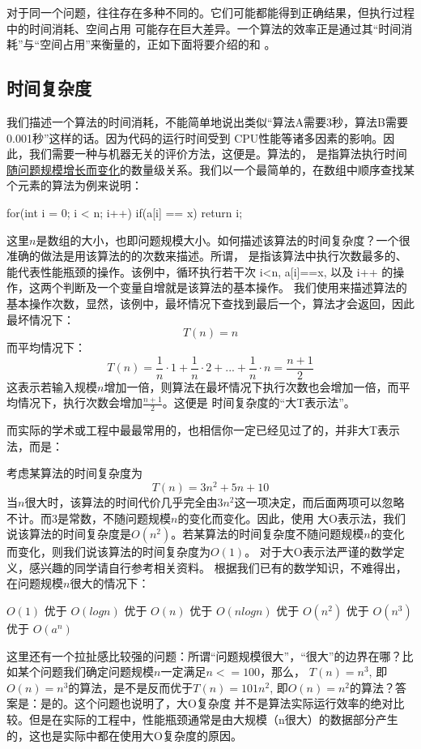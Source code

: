 对于同一个问题，往往存在多种不同的。它们可能都能得到正确结果，但执行过程中的时间消耗、空间占用
可能存在巨大差异。一个算法的效率正是通过其“时间消耗”与“空间占用”来衡量的，正如下面将要介绍的和
。

\subsection{时间复杂度}
我们描述一个算法的时间消耗，不能简单地说出类似“算法A需要3秒，算法B需要0.001秒”这样的话。因为代码的运行时间受到
CPU性能等诸多因素的影响。因此，我们需要一种与机器无关的评价方法，这便是。算法的，
是指算法执行时间\uline{随问题规模增长而变化}的数量级关系。我们以一个最简单的，在数组中顺序查找某个元素的算法为例来说明：
\begin{cppcode}
for(int i = 0; i < n; i++)
{
    if(a[i] == x)
        return i;
}
\end{cppcode}
这里\(n\)是数组的大小，也即问题规模大小。如何描述该算法的时间复杂度？一个很准确的做法是用该算法的的次数来描述。所谓，
是指该算法中执行次数最多的、能代表性能瓶颈的操作。该例中，循环执行若干次 i<n, a[i]==x, 以及 i++ 的操作，这两个判断及一个变量自增就是该算法的基本操作。
我们使用来描述算法的基本操作次数，显然，该例中，最坏情况下查找到最后一个，算法才会返回，因此最坏情况下：
\[
T(n)=n
\]
而平均情况下：
\[
T(n) = \frac{1}{n}\cdot 1 + \frac{1}{n}\cdot 2 + ... + \frac{1}{n}\cdot n = \frac{n+1}{2}
\]
这表示若输入规模\(n\)增加一倍，则算法在最坏情况下执行次数也会增加一倍，而平均情况下，执行次数会增加\(\frac{n+1}{2}\)。这便是
时间复杂度的“大T表示法”。

而实际的学术或工程中最最常用的，也相信你一定已经见过了的，并非大T表示法，而是：

考虑某算法的时间复杂度为
\[
T(n) = 3n^{2} + 5n + 10
\]
当\(n\)很大时，该算法的时间代价几乎完全由\(3n^2\)这一项决定，而后面两项可以忽略不计。而3是常数，不随问题规模\(n\)的变化而变化。因此，使用
大O表示法，我们说该算法的时间复杂度是\(O(n^2)\)。若某算法的时间复杂度不随问题规模\(n\)的变化而变化，则我们说该算法的时间复杂度为\(O(1)\)。
对于大O表示法严谨的数学定义，感兴趣的同学请自行参考相关资料。
根据我们已有的数学知识，不难得出，在问题规模\(n\)很大的情况下：
\begin{bulk}
    \(O(1)\) 优于 \(O(logn)\) 优于 \(O(n)\) 优于 \(O(nlogn)\) 优于 \(O(n^2)\) 优于 \(O(n^3)\) 优于 \(O(a^n)\)
\end{bulk}
\begin{insightbox}
这里还有一个拉扯感比较强的问题：所谓“问题规模很大”，“很大”的边界在哪？比如某个问题我们确定问题规模\(n\)一定满足\(n<=100\)，那么，
\(T(n) = n^3\), 即\(O(n) = n^3\)的算法，是不是反而优于\(T(n) = 101n^2\), 即\(O(n) = n^2\)的算法？答案是：是的。这个问题也说明了，大O复杂度
并不是算法实际运行效率的绝对比较。但是在实际的工程中，性能瓶颈通常是由大规模（n很大）的数据部分产生的，这也是实际中都在使用大O复杂度的原因。
\end{insightbox}

